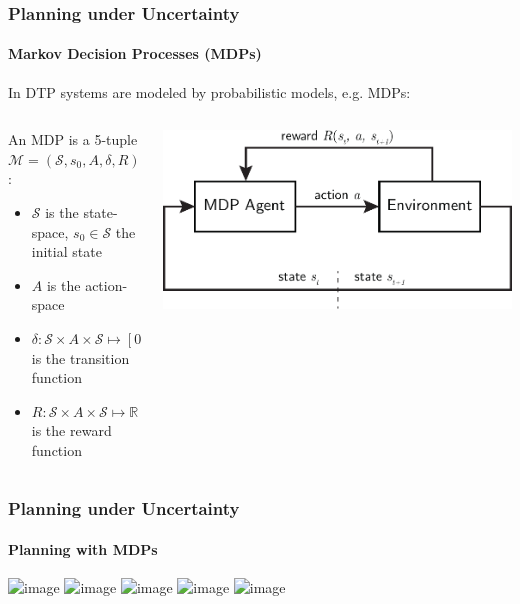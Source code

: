 \begin{frame}
	\frametitle{Planning under Uncertainty}
	\framesubtitle{Markov Decision Processes (MDPs)}
	
	In DTP systems are modeled by probabilistic models, e.g. MDPs:
	\begin{columns}[T]
		\begin{column}{0.6\textwidth}
			\begin{definition}
				An MDP is a 5-tuple $\mathcal{M} = (\mathcal{S}, s_0, A, \delta, R)$:
				\begin{itemize}
					\item $\mathcal{S}$ is the state-space, $s_0 \in \mathcal{S}$ the initial state
					\item $A$ is the action-space
					\item $\delta: \mathcal{S} \times A \times \mathcal{S} \mapsto [0, 1]$ is the transition function %
					\item $R: \mathcal{S} \times A \times \mathcal{S} \mapsto \mathbb{R}$ is the reward function
				\end{itemize}
			\end{definition}
		\end{column}
		\begin{column}{0.425\textwidth}
			\vspace{26pt}
			\includegraphics[width=\linewidth]{figures/mdp-2v3}
		\end{column}
	\end{columns}
\end{frame}

\begin{frame}
	\frametitle{Planning under Uncertainty}
	\framesubtitle{Planning with MDPs}
	\vspace{-10pt}
	\begin{center}
		\includegraphics<1>[width=0.9\textwidth]{figures/planning_routine/mdp-planning-diagram-v2-1}
		\includegraphics<2>[width=0.9\textwidth]{figures/planning_routine/mdp-planning-diagram-v3-2}
		\includegraphics<3>[width=0.9\textwidth]{figures/planning_routine/mdp-planning-diagram-v3-3}
		\includegraphics<4>[width=0.9\textwidth]{figures/planning_routine/mdp-planning-diagram-v3-4}
		\includegraphics<5>[width=0.9\textwidth]{figures/planning_routine/mdp-planning-diagram-v3-5}
	\end{center}
\end{frame}

